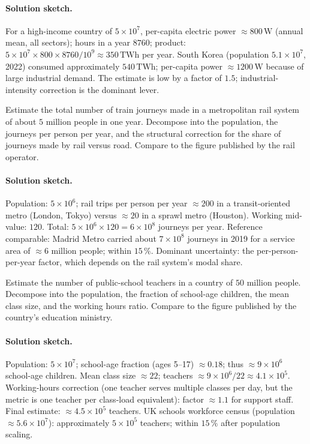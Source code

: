 \paragraph{Solution sketch.}
For a high-income country of $5 \times 10^{7}$, per-capita electric
power $\approx 800 \,\si{\watt}$ (annual mean, all sectors); hours
in a year $8760$; product: $5 \times 10^{7} \times 800 \times 8760
/ 10^{9} \approx 350 \,\text{TWh}$ per year. South Korea (population
$5.1 \times 10^{7}$, 2022) consumed approximately $540 \,\text{TWh}$;
per-capita power $\approx 1200 \,\si{\watt}$ because of large
industrial demand. The estimate is low by a factor of $1.5$;
industrial-intensity correction is the dominant lever.

\begin{exercise}
Estimate the total number of train journeys made in a metropolitan
rail system of about $5$ million people in one year. Decompose into
the population, the journeys per person per year, and the
structural correction for the share of journeys made by rail
versus road. Compare to the figure published by the rail operator.
\end{exercise}

\paragraph{Solution sketch.}
Population: $5 \times 10^{6}$; rail trips per person per year
$\approx 200$ in a transit-oriented metro (London, Tokyo)
versus $\approx 20$ in a sprawl metro (Houston). Working mid-value:
$120$. Total: $5 \times 10^{6} \times 120 = 6 \times 10^{8}$
journeys per year. Reference comparable: Madrid Metro carried
about $7 \times 10^{8}$ journeys in 2019 for a service area of
$\approx 6$ million people; within $15\,\%$. Dominant uncertainty:
the per-person-per-year factor, which depends on the rail system's
modal share.

\begin{exercise}
Estimate the number of public-school teachers in a country of $50$
million people. Decompose into the population, the fraction of
school-age children, the mean class size, and the working hours
ratio. Compare to the figure published by the country's education
ministry.
\end{exercise}

\paragraph{Solution sketch.}
Population: $5 \times 10^{7}$; school-age fraction (ages 5--17)
$\approx 0.18$; thus $\approx 9 \times 10^{6}$ school-age
children. Mean class size $\approx 22$; teachers $\approx 9
\times 10^{6} / 22 \approx 4.1 \times 10^{5}$. Working-hours
correction (one teacher serves multiple classes per day, but
the metric is one teacher per class-load equivalent): factor
$\approx 1.1$ for support staff. Final estimate: $\approx 4.5
\times 10^{5}$ teachers. UK schools workforce census (population
$\approx 5.6 \times 10^{7}$): approximately $5 \times 10^{5}$
teachers; within $15\,\%$ after population scaling.

